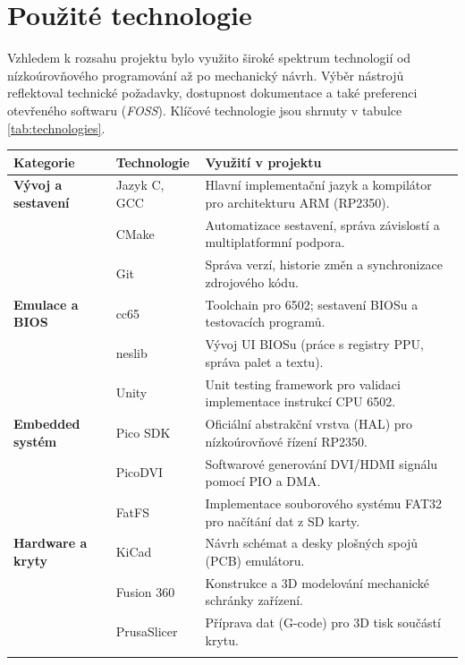 \chapter*{Použité technologie}

Vzhledem k rozsahu projektu bylo využito široké spektrum technologií od nízkoúrovňového programování
až po mechanický návrh. Výběr nástrojů reflektoval technické požadavky, dostupnost dokumentace a
také preferenci otevřeného softwaru (\textit{FOSS}). Klíčové technologie jsou shrnuty v tabulce
\ref{tab:technologies}.

\begin{table}[htbp]
    \centering
    \small
    \begin{tabularx}{\textwidth}{l l >{\raggedright\arraybackslash}X}
        \toprule
        \textbf{Kategorie} & \textbf{Technologie} & \textbf{Využití v projektu} \\
        \midrule

        \textbf{Vývoj a sestavení}
        & Jazyk C, GCC
        & Hlavní implementační jazyk a kompilátor pro architekturu ARM (RP2350). \\
        & CMake
        & Automatizace sestavení, správa závislostí a multiplatformní podpora. \\
        & Git
        & Správa verzí, historie změn a synchronizace zdrojového kódu. \\
        \addlinespace

        \textbf{Emulace a BIOS}
        & cc65
        & Toolchain pro 6502; sestavení BIOSu a testovacích programů. \\
        & neslib
        & Vývoj UI BIOSu (práce s registry PPU, správa palet a textu). \\
        & Unity
        & Unit testing framework pro validaci implementace instrukcí CPU 6502. \\
        \addlinespace

        \textbf{Embedded systém}
        & Pico SDK
        & Oficiální abstrakční vrstva (HAL) pro nízkoúrovňové řízení RP2350. \\
        & PicoDVI
        & Softwarové generování DVI/HDMI signálu pomocí PIO a DMA. \\
        & FatFS
        & Implementace souborového systému FAT32 pro načítání dat z SD karty. \\
        \addlinespace

        \textbf{Hardware a kryty}
        & KiCad
        & Návrh schémat a desky plošných spojů (PCB) emulátoru. \\
        & Fusion 360
        & Konstrukce a 3D modelování mechanické schránky zařízení. \\
        & PrusaSlicer
        & Příprava dat (G-code) pro 3D tisk součástí krytu. \\
        \addlinespace


\end{tabularx}
\end{table}
